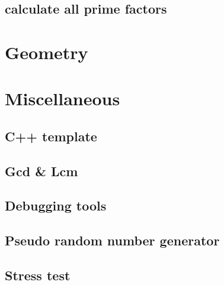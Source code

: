 \subsection{calculate all prime factors}
\raggedbottom
\hrulefill

\section{Geometry}

\section{Miscellaneous}
\subsection{C++ template}
\raggedbottom
\hrulefill
\subsection{Gcd \& Lcm}
\raggedbottom
\hrulefill
\subsection{Debugging tools}
\raggedbottom
\hrulefill
\subsection{Pseudo random number generator}
\raggedbottom
\hrulefill
\subsection{Stress test}
\raggedbottom
\hrulefill
